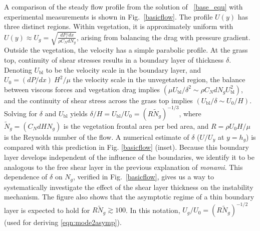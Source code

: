 \documentclass[aps,prl,reprint,twocolumn,superscriptaddress,sort&compress,10pt]{revtex4-1}  %
\newcommand{\hg}{h_g}
\newcommand{\Rey}{{R}}
\newcommand{\Ndg}{\tilde{N}_g}
\newcommand{\monami}{\textit{monami}}
\newcommand{\ubl}{U_\text{bl}}
\newcommand{\ReyNdg}{{\Rey\Ndg}}
\begin{document}
A comparison of the steady flow profile from the solution of ~\eqref{base_equ} with experimental measurements is shown in Fig.~\ref{basicflow}.
The profile $U(y)$ has three distinct regions.
Within vegetation, it is approximately uniform with $ U(y) \approx U_g = \sqrt{\frac{dP/dx}{\rho C_N dN_g}}$, arising from balancing the drag with pressure gradient. 
Outside the vegetation, the velocity has a simple parabolic profile. %
At the grass top, continuity of shear stresses results in a boundary layer of thickness $\delta$. 
Denoting $\ubl$ to be the velocity scale in the boundary layer, and $U_0 = {(dP/dx)~H^2}/{\mu}$ the velocity scale in the unvegetated region, the balance between viscous forces and vegetation drag implies $(\mu \ubl/\delta^2 \sim \rho C_N d N_g \ubl^2)$, and the continuity of shear stress across the grass top implies $(\ubl/\delta \sim U_0/H)$.
Solving for $\delta$ and $\ubl$ yields $\delta/H = \ubl/U_0=(\ReyNdg)^{-1/3}$, where $\Ndg = \left(C_N d H N_g\right)$ is the vegetation frontal area per bed area, and $\Rey=\rho U_0 H/\mu$ is the Reynolds number of the flow. 
A numerical estimate of $\delta$ ($U/U_y$ at $y=\hg$) is compared with this prediction in Fig. \ref{basicflow} (inset).
Because this boundary layer develops independent of the influence of the boundaries, we identify it to be analogous to the free shear layer \cite{Ghisal02,Nepf04} in the previous explanation of \monami.
This dependence of $\delta$ on $N_g$, verified in Fig.~\ref{basicflow}, gives us a way to systematically investigate the effect of the shear layer thickness on the instability mechanism.
The figure also shows that the asymptotic regime of a thin boundary layer is expected to hold for $\ReyNdg \gtrsim 100$. In this notation, $U_g/U_0 = (\Rey \Ndg)^{-1/2}$ (used for deriving \eqref{eqn:mode2asymp}). 
\end{document}

